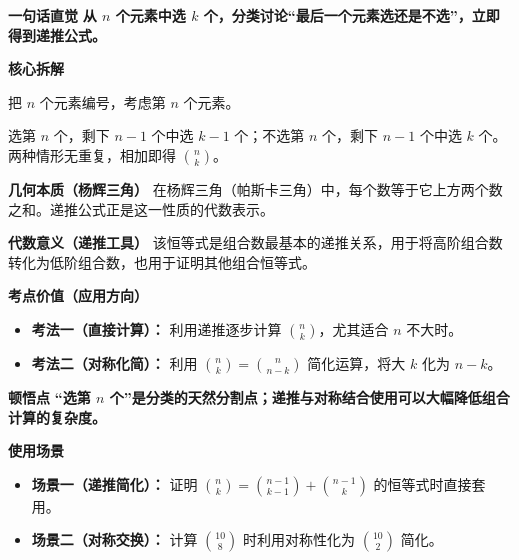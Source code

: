 \begin{explanationbox}
	\textbf{\textcolor{CExplanation}{一句话直觉}}
	\textbf{从 $n$ 个元素中选 $k$ 个，分类讨论“最后一个元素选还是不选”，立即得到递推公式。}

	\medskip
	\textbf{\textcolor{CExplanation}{核心拆解}}
	\begin{description}[style=nextline, leftmargin=2.8em, labelsep=0.5em, itemsep=0.45em]
		\item[\textbf{要点一（分类标准）：}]
			把 $n$ 个元素编号，考虑第 $n$ 个元素。
		\item[\textbf{要点二（两种情形）：}]
			选第 $n$ 个，剩下 $n-1$ 个中选 $k-1$ 个；不选第 $n$ 个，剩下 $n-1$ 个中选 $k$ 个。两种情形无重复，相加即得 $\binom{n}{k}$。
	\end{description}

	\medskip
	\textbf{\textcolor{CExplanation}{几何本质（杨辉三角）}}
	在杨辉三角（帕斯卡三角）中，每个数等于它上方两个数之和。递推公式正是这一性质的代数表示。

	\medskip
	\textbf{\textcolor{CExplanation}{代数意义（递推工具）}}
	该恒等式是组合数最基本的递推关系，用于将高阶组合数转化为低阶组合数，也用于证明其他组合恒等式。

	\medskip
	\textbf{\textcolor{CExplanation}{考点价值（应用方向）}}
	\begin{itemize}[leftmargin=*, itemsep=0.5em, topsep=0.4em]
		\item \textbf{考法一（直接计算）：} 利用递推逐步计算 $\binom{n}{k}$，尤其适合 $n$ 不大时。
		\item \textbf{考法二（对称化简）：} 利用 $\binom{n}{k}=\binom{n}{n-k}$ 简化运算，将大 $k$ 化为 $n-k$。
	\end{itemize}

	\medskip
	\textbf{\textcolor{CExplanation}{顿悟点}}
	\textbf{“选第 $n$ 个”是分类的天然分割点；递推与对称结合使用可以大幅降低组合计算的复杂度。}

	\medskip
	\textbf{\textcolor{CExplanation}{使用场景}}
	\begin{itemize}[leftmargin=*, itemsep=0.5em, topsep=0.4em]
		\item \textbf{场景一（递推简化）：} 证明 $\binom{n}{k}=\binom{n-1}{k-1}+\binom{n-1}{k}$ 的恒等式时直接套用。
		\item \textbf{场景二（对称交换）：} 计算 $\binom{10}{8}$ 时利用对称性化为 $\binom{10}{2}$ 简化。
	\end{itemize}

\end{explanationbox}

